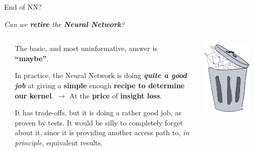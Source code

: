 \documentclass[9pt]{beamer}
\begin{document}
\begin{frame}{End of NN?}
    \begin{center}
        \itshape Can we \alert{\textbf{retire}} the \textbf{Neural Network}?
    \end{center}
    \vspace*{10pt}

    \begin{columns}
        \begin{column}{0.02\textwidth}
        \end{column}
        \begin{column}{0.6\textwidth}
            The basic, and most uninformative, answer is \textbf{\enquote{maybe}}.
            \vspace*{10pt}

            In practice, the Neural Network is doing \textit{\textbf{quite a
            good job}} at giving a \textbf{simple} enough \textbf{recipe to
            \alert{determine our kernel}}.
            $\to$ At the \textbf{price} of \textbf{insight loss}.
            \vspace*{10pt}

            It has trade-offs, but it is doing a rather good job, as proven by
            tests.
            It would be silly to completely forget about it, since it is
            providing another access path to, \textit{in principle}, equivalent
            results.
        \end{column}
        \begin{column}{0.3\textwidth}
            \includegraphics[width=0.8\textwidth]{retire-nn.png}
        \end{column}
    \end{columns}
\end{frame}
\end{document}

